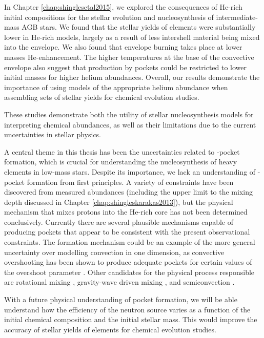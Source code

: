 In Chapter \ref{chap:shinglesetal2015}, we explored the consequences of He-rich initial compositions for the stellar evolution and nucleosynthesis of intermediate-mass AGB stars. We found that the stellar yields of \sprocess elements were substantially lower in He-rich models, largely as a result of less intershell material being mixed into the envelope. We also found that envelope burning takes place at lower masses He-enhancement. The higher temperatures at the base of the convective envelope also suggest that \sprocess production by  pockets could be restricted to lower initial masses for higher helium abundances. Overall, our results demonstrate the importance of using models of the appropriate helium abundance when assembling sets of stellar yields for chemical evolution studies.

These studies demonstrate both the utility of stellar nucleosynthesis models for interpreting chemical abundances, as well as their limitations due to the current uncertainties in stellar physics.

A central theme in this thesis has been the uncertainties related to -pocket formation, which is crucial for understanding the nucleosynthesis of heavy elements in low-mass stars. Despite its importance, we lack an understanding of -pocket formation from first principles. A variety of constraints have been discovered from measured abundances (including the upper limit to the mixing depth discussed in Chapter \ref{chap:shingleskarakas2013}), but the physical mechanism that mixes protons into the He-rich core has not been determined conclusively. Currently there are several plausible mechanisms capable of producing  pockets that appear to be consistent with the present observational constraints. The formation mechanism could be an example of the more general uncertainty over modelling convection in one dimension, as convective overshooting has been shown to produce adequate  pockets for certain values of the overshoot parameter \citep{Herwig:2000ua,Cristallo:2009kn}. Other candidates for the physical process responsible are rotational mixing \citep{Langer:1999tj,Herwig:2001vb}, gravity-wave driven mixing \citep{Denissenkov:2003gx}, and semiconvection \citep{Iben:1982cv,Hollowell:1989bd}.

With a future physical understanding of  pocket formation, we will be able understand how the efficiency of the  neutron source varies as a function of the initial chemical composition and the initial stellar mass. This would improve the accuracy of stellar yields of \sprocess elements for chemical evolution studies.


